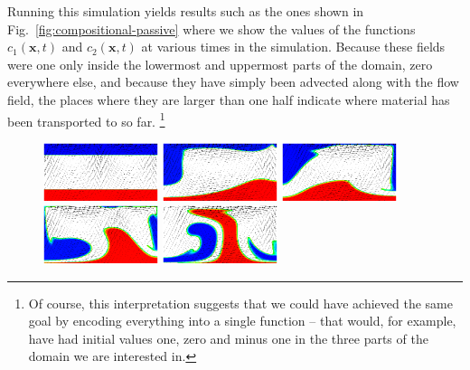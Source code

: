 \documentclass{article}
\begin{document}
Running this simulation yields results such as the ones shown in
Fig.~\ref{fig:compositional-passive} where we show the values of the functions
$c_1(\mathbf x,t)$ and $c_2(\mathbf x,t)$ at various times in the simulation.
Because these fields were one only inside the lowermost and uppermost parts of
the domain, zero everywhere else, and because they have simply been advected
along with the flow field, the places where they are larger than one half
indicate where material has been transported to so far.%
\footnote{Of course, this interpretation suggests that we could have achieved
the same goal by encoding everything into a single function -- that would, for
example, have had initial values one, zero and minus one in the three parts of
the domain we are interested in.}

\begin{figure}
  \centering
  \includegraphics[width=0.3\textwidth]{cookbooks/composition-passive/visit0007.png}
  \hfill
  \includegraphics[width=0.3\textwidth]{cookbooks/composition-passive/visit0008.png}
  \hfill
  \includegraphics[width=0.3\textwidth]{cookbooks/composition-passive/visit0009.png}
  \\
  \includegraphics[width=0.3\textwidth]{cookbooks/composition-passive/visit0010.png}
  \hfill
  \includegraphics[width=0.3\textwidth]{cookbooks/composition-passive/visit0012.png}

\end{figure}
\end{document}
